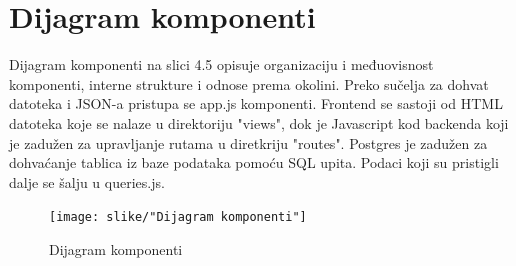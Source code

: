 			\eject
			
		\section{Dijagram komponenti}
			Dijagram komponenti na slici 4.5 opisuje organizaciju i međuovisnost komponenti, interne strukture i odnose prema okolini. Preko sučelja za dohvat datoteka i JSON-a pristupa se app.js komponenti. Frontend se sastoji od HTML datoteka koje se nalaze u direktoriju "views", dok je Javascript kod backenda koji je zadužen za upravljanje rutama u diretkriju "routes".
			Postgres je zadužen za dohvaćanje tablica iz baze podataka pomoću SQL upita. Podaci koji su pristigli dalje se šalju u queries.js.
			
			\begin{figure}[H]
				\texttt{[image: slike/"Dijagram komponenti"]} %
				\centering
				\caption{Dijagram komponenti}
				\label{Component Diagram} %
			\end{figure}		